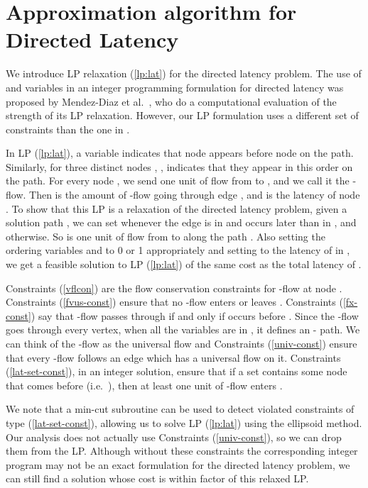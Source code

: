 \documentclass[11pt]{article}
\begin{document}
\section{Approximation algorithm for Directed Latency} \label{sec:latency}
We introduce LP relaxation (\ref{lp:lat}) for the directed latency problem.
The use of  and  variables in an integer programming formulation for directed latency was proposed by Mendez-Diaz et al.\ \cite{mendez-diaz}, who do a computational evaluation of the strength of its LP relaxation. However, our LP formulation uses a different set of constraints than the one in \cite{mendez-diaz}.

In LP (\ref{lp:lat}), a variable  indicates
that node  appears before node  on the path. Similarly,  for three distinct nodes , ,  indicates that they appear in this order on the path. For every node ,
we send one unit of flow from  to , and we call it the -flow. 
Then  is the amount of -flow going through edge , and  is the latency of node .
To show that this LP is a relaxation of the directed latency problem, given a solution path , 
we can set  whenever the edge  is in  and  occurs later than  in , 
and  otherwise. So  is one unit of flow from  to  along the path .
Also setting the ordering variables  and  to 0 or 1 appropriately and setting  to the latency of  in , we get a feasible solution to LP (\ref{lp:lat}) of the same cost as the total latency of .

\begin{figure}[ht]

\end{figure}


Constraints (\ref{vflcon}) are the flow conservation constraints for -flow at node .
 Constraints (\ref{fvus-const}) ensure that no -flow enters  or leaves . 
Constraints (\ref{fx-const}) say that -flow passes through  if and only if  occurs before . 
Since the -flow goes through every vertex, when all the variables are in , it defines an - path.
We can think of the -flow as the universal flow
and Constraints (\ref{univ-const}) ensure that every  -flow follows an edge which
has a universal flow on it. 
Constraints (\ref{lat-set-const}), in an integer solution, ensure that if a set  contains some node 
 that comes before  (i.e.\ ), then at least one unit of -flow enters . 

We note 
that a min-cut subroutine can be used to detect violated constraints of type (\ref{lat-set-const}), allowing us to solve 
 LP (\ref{lp:lat}) using the ellipsoid method. 
Our analysis does not actually use 
Constraints (\ref{univ-const}), so we can drop them from the LP. Although without these
constraints the corresponding integer program may not be an exact formulation
for the directed latency problem,
we can still find a solution whose cost is within factor  of this relaxed LP.
\end{document}
